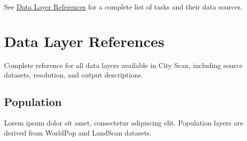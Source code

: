 \documentclass[
  letterpaper,
  DIV=11,
  numbers=noendperiod]{scrreprt}
\begin{document}
\begin{tcolorbox}[enhanced jigsaw, arc=.35mm, bottomrule=.15mm, bottomtitle=1mm, breakable, colback=white, colbacktitle=quarto-callout-note-color!10!white, colframe=quarto-callout-note-color-frame, coltitle=black, left=2mm, leftrule=.75mm, opacityback=0, opacitybacktitle=0.6, rightrule=.15mm, title=\textcolor{quarto-callout-note-color}{\faInfo}\hspace{0.5em}{Note}, titlerule=0mm, toprule=.15mm, toptitle=1mm]

See \href{datalayer-references.qmd}{Data Layer References} for a
complete list of tasks and their data sources.

\end{tcolorbox}

\chapter{Data Layer References}\label{data-layer-references}

Complete reference for all data layers available in City Scan, including
source datasets, resolution, and output descriptions.

\section{Population}\label{population}

Lorem ipsum dolor sit amet, consectetur adipiscing elit. Population
layers are derived from WorldPop and LandScan datasets.
\end{document}
